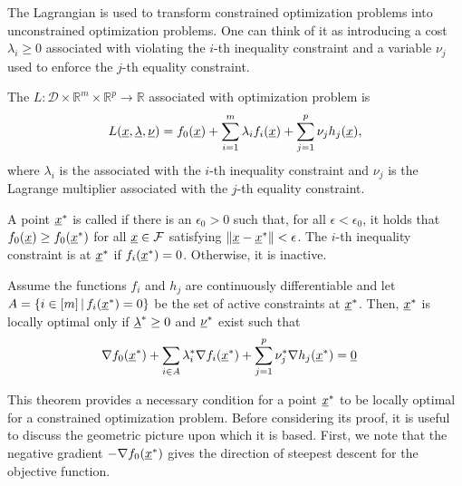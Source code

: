The Lagrangian is used to transform constrained optimization problems into unconstrained optimization problems.
One can think of it as introducing a cost $\lambda_i \geq 0$ associated with violating the $i$-th inequality constraint and a variable $\nu_j$ used to enforce the $j$-th equality constraint.

\begin{definition}
The  $L \colon \mathcal{D} \times \mathbb{R}^m \times \mathbb{R}^p \rightarrow \mathbb{R}$ associated with optimization problem is
\[ L(\underline{x},\underline{\lambda},\underline{\nu}) = f_0(\underline{x}) + \sum_{i=1}^m \lambda_i f_i(\underline{x}) + \sum_{j=1}^p \nu_j h_j(\underline{x}), \]
where $\lambda_i$ is the  associated with the $i$-th inequality constraint and $\nu_j$ is the Lagrange multiplier associated with the $j$-th equality constraint.
\end{definition}

\begin{definition}
A point $\underline{x}^*$ is called  if there is an $\epsilon_0 >0$ such that, for all $\epsilon< \epsilon_0$, it holds that $f_0 (\underline{x}) \geq f_0 (\underline{x}^*)$ for all $\underline{x} \in \mathcal{F}$ satisfying $\| \underline{x} - \underline{x}^* \| < \epsilon$.
The $i$-th inequality constraint is  at $\underline{x}^*$ if $f_i (\underline{x}^*)=0$.
Otherwise, it is inactive.
\end{definition}

\begin{theorem}
\label{theorem:KKT}
Assume the functions $f_i$ and $h_j$ are continuously differentiable and let $A = \{ i\in [m] \, | \, f_i (\underline{x}^*)=0 \}$ be the set of active constraints at $\underline{x}^*$.
Then, $\underline{x}^*$ is locally optimal only if $\underline{\lambda}^* \geq 0$ and $\underline{\nu}^*$ exist such that
\begin{align}
\label{eq:KKT1} \nabla f_0 (\underline{x}^*) + \sum_{i\in A} \lambda_i^* \nabla f_i (\underline{x}^*) + \sum_{j=1}^p \nu_j^* \nabla h_j (\underline{x}^*) &= \underline{0}
\end{align}
\end{theorem}

This theorem provides a necessary condition for a point $\underline{x}^*$ to be locally optimal for a constrained optimization problem.
Before considering its proof, it is useful to discuss the geometric picture upon which it is based.
First, we note that the negative gradient $-\nabla f_0 (\underline{x}^*)$ gives the direction of steepest descent for the objective function.

